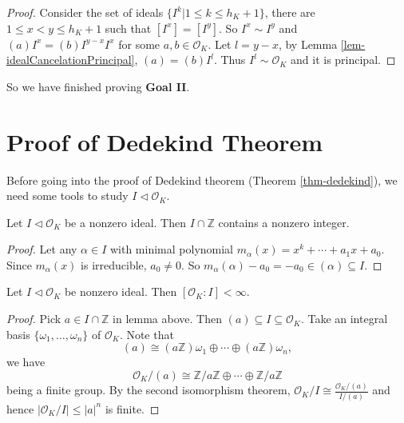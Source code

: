 \begin{proof}
    Consider the set of ideals $\{I^{k}|1\leq k\leq h_{K}+1\}$, there are $1\leq x<y\leq h_{K}+1$ such that $[I^{x}]=[I^{y}]$. So $I^{x}\sim I^{y}$ and $(a)I^{x}=(b)I^{y-x}I^{x}$ for some $a,b\in \mathcal{O}_{K}$. Let $l=y-x$, by Lemma \ref{lem-idealCancelationPrincipal}, $(a)=(b)I^{l}$. Thus $I^{l}\sim \mathcal{O}_{K}$ and it is principal. 
\end{proof}
So we have finished proving {\bf Goal II}.


\section{Proof of Dedekind Theorem}
Before going into the proof of Dedekind theorem (Theorem \ref{thm-dedekind}), we need some tools to study $I\lhd\mathcal{O}_{K}$. 

\begin{lemma}\label{lem-nonzeroIntegerInIdeal}
    Let $I\lhd \mathcal{O}_{K}$ be a nonzero ideal. Then $I\cap \mathbb{Z}$ contains a nonzero integer. 
\end{lemma}

\begin{proof}
    Let any $\alpha\in I$ with minimal polynomial $m_{\alpha}(x)=x^{k}+\cdots+a_{1}x+a_{0}$. Since $m_{\alpha}(x)$ is irreducible, $a_{0}\neq 0$. So $m_{\alpha}(\alpha)-a_{0}=-a_{0}\in (\alpha)\subseteq I$. 
\end{proof}

\begin{proposition}
    Let $I\lhd \mathcal{O}_{K}$ be nonzero ideal. Then $[\mathcal{O}_{K}:I]<\infty$. 
\end{proposition}

\begin{proof}
    Pick $a\in I\cap \mathbb{Z}$ in lemma above. Then $(a)\subseteq I\subseteq \mathcal{O}_{K}$. Take an integral basis $\{\omega_{1},\dots, \omega_{n}\}$ of $\mathcal{O}_{K}$. Note that
    \[
    (a)\cong (a\mathbb{Z})\omega_{1}\oplus\cdots\oplus (a\mathbb{Z})\omega_{n},
    \]
    we have 
    \[\mathcal{O}_{K}/(a)\cong \mathbb{Z} /a\mathbb{Z}\oplus \cdots\oplus \mathbb{Z} /a\mathbb{Z}\]
    being a finite group. By the second isomorphism theorem, $\mathcal{O}_{K} /I\cong \frac{\mathcal{O}_{K} /(a)}{I /(a)}$ and hence $\left| \mathcal{O}_{K} /I \right| \leq \left| a \right| ^{n}$ is finite.
\end{proof}

